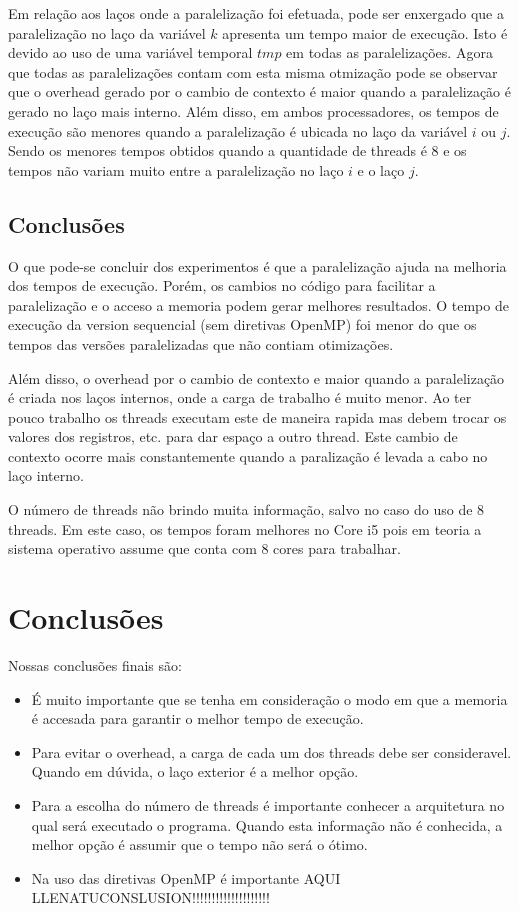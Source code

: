 \documentclass[a4paper,12pt,fleqn]{article}
\begin{document}
Em relação aos laços onde a paralelização foi efetuada, pode ser enxergado que a paralelização no laço da variável $k$ apresenta um tempo maior de execução. Isto é devido ao uso de uma variável temporal $tmp$ em todas as paralelizações. Agora que todas as paralelizações contam com esta misma otmização pode se observar que o overhead gerado por o cambio de contexto é maior quando a paralelização é gerado no laço mais interno. Além disso, em ambos processadores, os tempos de execução são menores quando a paralelização é ubicada no laço da variável $i$ ou $j$. Sendo os menores tempos obtidos quando a quantidade de threads é 8 e os tempos não variam muito entre a paralelização no laço $i$ e o laço $j$. 

\subsection{Conclusões} 

O que pode-se concluir dos experimentos é que a paralelização ajuda na melhoria dos tempos de execução. Porém, os cambios no código para facilitar a paralelização e o acceso a memoria podem gerar melhores resultados. O tempo de execução da version sequencial (sem diretivas OpenMP) foi menor do que os tempos das versões paralelizadas que não contiam otimizações. 

Além disso, o overhead por o cambio de contexto e maior quando a paralelização é criada nos laços internos, onde a carga de trabalho é muito menor. Ao ter pouco trabalho os threads executam este de maneira rapida mas debem trocar os valores dos registros, etc. para dar espaço a outro thread. Este cambio de contexto ocorre mais constantemente quando a paralização é levada a cabo no laço interno. 

O número de threads não brindo muita informação, salvo no caso do uso de 8 threads. Em este caso, os tempos foram melhores no Core i5 pois em teoria a sistema operativo assume que conta com 8 cores para trabalhar. 

\clearpage 

\section{Conclusões} 
Nossas conclusões finais são:
\begin{itemize}
    \item É muito importante que se tenha em consideração o modo em que a memoria é accesada para garantir o melhor tempo de execução.
    \item Para evitar o overhead, a carga de cada um dos threads debe ser consideravel. Quando em dúvida, o laço exterior é a melhor opção. 
    \item Para a escolha do número de threads é importante conhecer a arquitetura no qual será executado o programa. Quando esta informação não é conhecida, a melhor opção é assumir que o tempo não será o ótimo.
    \item Na uso das diretivas OpenMP é importante AQUI LLENATUCONSLUSION!!!!!!!!!!!!!!!!!!!!
\end{itemize}
 
\end{document}
